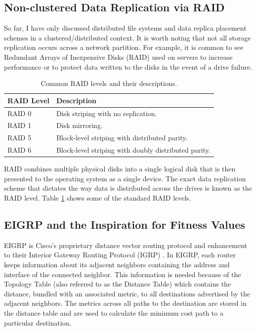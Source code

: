 \documentclass[12pt]{article}
\begin{document}
  \subsection{Non-clustered Data Replication via RAID}

  So far, I have only discussed distributed file systems and data replica
  placement schemes in a clustered/distributed context. It is worth noting
  that not all storage replication occurs across a network partition. For
  example, it is common to see Redundant Arrays of Inexpensive Disks (RAID)
  \cite{raid} \cite{raid2} used on servers to increase performance or to
  protect data written to the disks in the event of a drive failure.

  \begin{table}[htbp]
    \caption{Common RAID levels and their descriptions.}
    \label{tbl:raid-levels}
    \begin{center}
    \begin{tabular}{ | l | l | }
      \hline
      \textbf{RAID Level} & \textbf{Description} \\ \hline
      RAID 0 & Disk striping with no replication. \\ \hline
      RAID 1 & Disk mirroring. \\ \hline
      RAID 5 & Block-level striping with distributed parity. \\ \hline
      RAID 6 & Block-level striping with doubly distributed parity. \\ \hline
      \hline
    \end{tabular}
    \end{center}
  \end{table}

  RAID combines multiple physical disks into a single logical disk that is then
  presented to the operating system as a single device. The exact data
  replication scheme that dictates the way data is distributed across the
  drives is known as the RAID level. Table \ref{tbl:raid-levels} shows some of
  the standard RAID levels.

  \subsection{EIGRP and the Inspiration for Fitness Values}
  \label{eigrp-motivation}

  EIGRP \cite{eigrp} is Cisco's proprietary distance vector
  \cite{distance-vector-1} routing protocol and enhancement to their Interior
  Gateway Routing Protocol (IGRP) \cite{igrp}. In EIGRP, each router keeps
  information about its adjacent neighbors containing the address and interface
  of the connected neighbor. This information is needed because of the Topology
  Table (also referred to as the Distance Table) which contains the distance,
  bundled with an associated metric, to all destinations advertised by the
  adjacent neighbors. The metrics across all paths to the destination are
  stored in the distance table and are used to calculate the minimum cost path
  to a particular destination.
\end{document}
